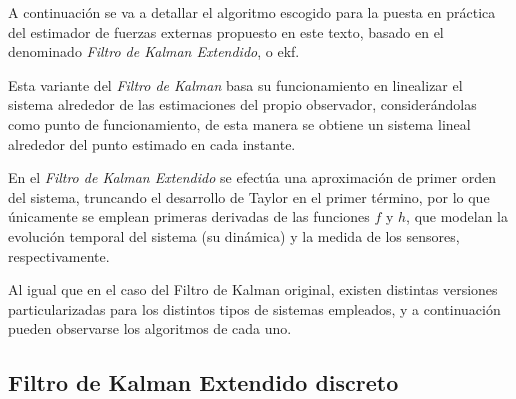 A continuación se va a detallar el algoritmo escogido para la puesta en práctica del estimador de fuerzas externas propuesto en este texto, basado en el denominado \emph{Filtro de Kalman Extendido}, o \acrshort{ekf}. \par 

Esta variante del \emph{Filtro de Kalman} basa su funcionamiento en linealizar el sistema alrededor de las estimaciones del propio observador, considerándolas como punto de funcionamiento, de esta manera se obtiene un sistema lineal alrededor del punto estimado en cada instante. \par 

En el \emph{Filtro de Kalman Extendido} se efectúa una aproximación de primer orden del sistema, truncando el desarrollo de Taylor en el primer término, por lo que únicamente se emplean primeras derivadas de las funciones $f$ y $h$, que modelan la evolución temporal del sistema (su dinámica) y la medida de los sensores, respectivamente. \par 

Al igual que en el caso del Filtro de Kalman original, existen distintas versiones particularizadas para los distintos tipos de sistemas empleados, y a continuación pueden observarse los algoritmos de cada uno. \par 

\subsection{Filtro de Kalman Extendido discreto}

